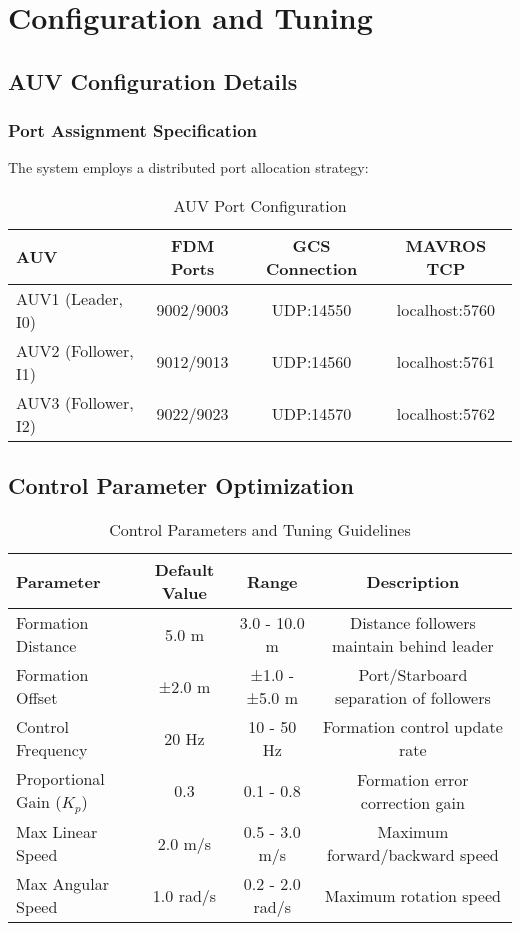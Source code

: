 \documentclass[11pt,a4paper]{article}
\begin{document}
\section{Configuration and Tuning}

\subsection{AUV Configuration Details}

\subsubsection{Port Assignment Specification}

The system employs a distributed port allocation strategy:

\begin{table}[h!]
\centering
\caption{AUV Port Configuration}
\begin{tabular}{@{}lccc@{}}
\toprule
\textbf{AUV} & \textbf{FDM Ports} & \textbf{GCS Connection} & \textbf{MAVROS TCP} \\
\midrule
AUV1 (Leader, I0) & 9002/9003 & UDP:14550 & localhost:5760 \\
AUV2 (Follower, I1) & 9012/9013 & UDP:14560 & localhost:5761 \\
AUV3 (Follower, I2) & 9022/9023 & UDP:14570 & localhost:5762 \\
\bottomrule
\end{tabular}
\label{tab:port_config}
\end{table}

\subsection{Control Parameter Optimization}

\begin{table}[h!]
\centering
\caption{Control Parameters and Tuning Guidelines}
\begin{tabular}{@{}lccc@{}}
\toprule
\textbf{Parameter} & \textbf{Default Value} & \textbf{Range} & \textbf{Description} \\
\midrule
Formation Distance & 5.0 m & 3.0 - 10.0 m & Distance followers maintain behind leader \\
Formation Offset & ±2.0 m & ±1.0 - ±5.0 m & Port/Starboard separation of followers \\
Control Frequency & 20 Hz & 10 - 50 Hz & Formation control update rate \\
Proportional Gain ($K_p$) & 0.3 & 0.1 - 0.8 & Formation error correction gain \\
Max Linear Speed & 2.0 m/s & 0.5 - 3.0 m/s & Maximum forward/backward speed \\
Max Angular Speed & 1.0 rad/s & 0.2 - 2.0 rad/s & Maximum rotation speed \\
\bottomrule
\end{tabular}
\label{tab:control_params}
\end{table}
\end{document}
